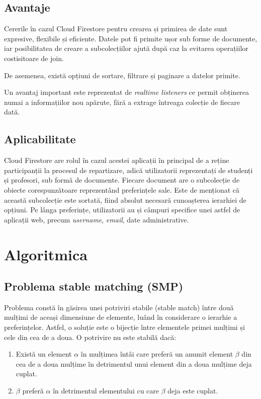 \subsection{Avantaje}
Cererile în cazul Cloud Firestore pentru crearea și primirea de date sunt expresive, flexibile și eficiente. Datele pot fi primite ușor sub forme de documente, iar posibilitatea de creare a subcolecțiilor ajută după caz la evitarea operațiilor costisitoare de join.

De asemenea, există opțiuni de sortare, filtrare și paginare a datelor primite.

Un avantaj important este reprezentat de \textit{realtime listeners} ce permit obținerea numai a informațiilor nou apărute, fără a extrage întreaga colecție de fiecare dată.

\subsection{Aplicabilitate}
Cloud Firestore are rolul în cazul acestei aplicații în principal de a reține participanții la procesul de repartizare, adică utilizatorii reprezentați de studenți și profesori, sub formă de documente. Fiecare document are o subcolecție de obiecte corespunzătoare reprezentând preferințele sale. Este de menționat că această subcolecție este sortată, fiind absolut necesară cunoașterea ierarhiei de opțiuni. Pe lânga preferințe, utilizatorii au și câmpuri specifice unei astfel de aplicații web, precum \textit{username}, \textit{email}, date administrative.

\section{Algoritmica}
\subsection{Problema stable matching (SMP)}
Problema constă în găsirea unei potriviri stabile (stable match) între două mulțimi de aceași dimensiune de elemente, luând în considerare o ierarhie a preferințelor. Astfel, o soluție este o bijecție între elementele primei mulțimi și cele din cea de a doua. O potrivire nu este stabilă dacă:

\begin{enumerate}
	\item Există un element $\alpha$ în mulțimea întâi care preferă un anumit element $\beta$ din cea de a doua mulțime în detrimentul unui element din a doua mulțime deja cuplat.
	\item $\beta$ preferă $\alpha$ în detrimentul elementului cu care $\beta$ deja este cuplat.
\end{enumerate}

